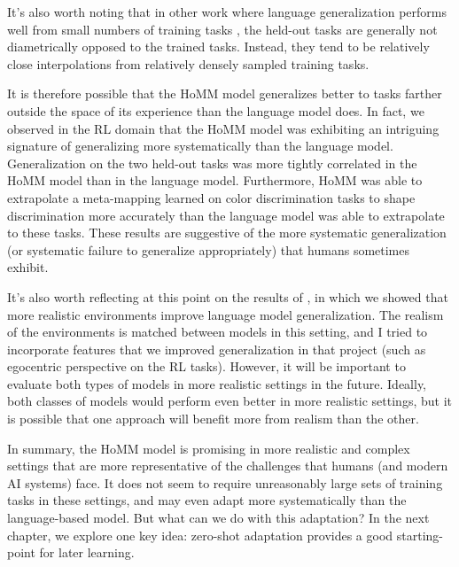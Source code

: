 It's also worth noting that in other work where language generalization performs well from small numbers of training tasks \citep[e.g. our work in ][]{Hill2019a}, the held-out tasks are generally not diametrically opposed to the trained tasks. Instead, they tend to be relatively close interpolations from relatively densely sampled training tasks. \par 

It is therefore possible that the HoMM model generalizes better to tasks farther outside the space of its experience than the language model does. In fact, we observed in the RL domain that the HoMM model was exhibiting an intriguing signature of generalizing more systematically than the language model. Generalization on the two held-out tasks was more tightly correlated in the HoMM model than in the language model. Furthermore, HoMM was able to extrapolate a meta-mapping learned on color discrimination tasks to shape discrimination more accurately than the language model was able to extrapolate to these tasks.
These results are suggestive of the more systematic generalization (or systematic failure to generalize appropriately) that humans sometimes exhibit. \par

It's also worth reflecting at this point on the results of \citet{Hill2019a}, in which we showed that more realistic environments improve language model generalization. The realism of the environments is matched between models in this setting, and I tried to incorporate features that we improved generalization in that project (such as egocentric perspective on the RL tasks). However, it will be important to evaluate both types of models in more realistic settings in the future. Ideally, both classes of models would perform even better in more realistic settings, but it is possible that one approach will benefit more from realism than the other. \par

In summary, the HoMM model is promising in more realistic and complex settings that are more representative of the challenges that humans (and modern AI systems) face. It does not seem to require unreasonably large sets of training tasks in these settings, and may even adapt more systematically than the language-based model. But what can we do with this adaptation? In the next chapter, we explore one key idea: zero-shot adaptation provides a good starting-point for later learning. 



